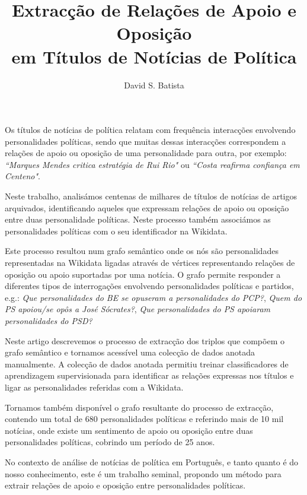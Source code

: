 \documentclass[a4paper, twocolumn, 11pt, twoside]{article}
\title{Extracção de Relações de Apoio e Oposição \\em Títulos de Notícias de Política}
\author{
  David S. Batista \\
  \email{dsbatista@gmail.com} 
}
\begin{document}
\maketitle

\begin{resumo}
Os títulos de notícias de política relatam com frequência interacções envolvendo personalidades políticas, sendo que muitas dessas interacções correspondem a relações de apoio ou oposição de uma personalidade para outra, por exemplo: \textit{``Marques Mendes critica estratégia de Rui Rio"} ou \textit{``Costa reafirma confiança em Centeno"}.

Neste trabalho, analisámos centenas de milhares de títulos de notícias de artigos arquivados, identificando aqueles que expressam relações de apoio ou oposição entre duas personalidade políticas. Neste processo também associámos as personalidades políticas com o seu identificador na Wikidata. 

Este processo resultou num grafo semântico onde os nós são personalidades representadas na Wikidata ligadas através de vértices representando relações de oposição ou apoio suportadas por uma notícia. O grafo permite responder a diferentes tipos de interrogações envolvendo personalidades políticas e partidos, e.g.: \textit{Que personalidades do BE se opuseram a personalidades do PCP?}, \textit{Quem do PS apoiou/se opôs a José Sócrates?}, \textit{Que personalidades do PS apoiaram personalidades do PSD?}

Neste artigo descrevemos o processo de extracção dos triplos que compõem o grafo semântico e tornamos acessível uma colecção de dados anotada manualmente. A colecção de dados anotada permitiu treinar classificadores de aprendizagem supervisionada para identificar as relações expressas nos títulos e ligar as personalidades referidas com a Wikidata. 

Tornamos também disponível o grafo resultante do processo de extracção, contendo um total de 680 personalidades políticas e referindo mais de 10 mil notícias, onde existe um sentimento de apoio ou oposição entre duas personalidades políticas, cobrindo um período de 25 anos.

No contexto de análise de notícias de política em Português, e tanto quanto é do nosso conhecimento, este é um trabalho seminal, propondo um método para extrair relações de apoio e oposição entre personalidades políticas.
\end{resumo}
\end{document}
